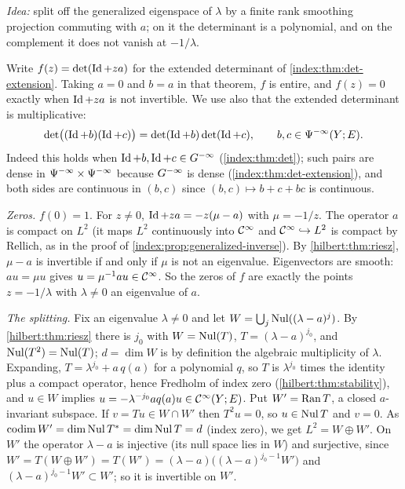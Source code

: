 \subsection*{}
\emph{Idea:} split off the generalized eigenspace of $\lambda$ by a finite rank
smoothing projection commuting with $a$; on it the determinant is a polynomial,
and on the complement it does not vanish at $-1/\lambda$.

Write $f(z)=\det(\operatorname{Id}+za)$ for the extended determinant of
\cref{index:thm:det-extension}. Taking $a=0$ and $b=a$ in that theorem, $f$ is entire,
and $f(z)=0$ exactly when $\operatorname{Id}+za$ is not invertible. We use also that the extended
determinant is multiplicative:
\begin{equation}\label{solindex:eq:mult}
  \det\bigl((\operatorname{Id}+b)(\operatorname{Id}+c)\bigr)=\det(\operatorname{Id}+b)\det(\operatorname{Id}+c),\qquad b,c\in\Psi^{-\infty}(Y;E).
\end{equation}
Indeed this holds when $\operatorname{Id}+b,\operatorname{Id}+c\in G^{-\infty}$ (\cref{index:thm:det}); such pairs are
dense in $\Psi^{-\infty}\times\Psi^{-\infty}$ because $G^{-\infty}$ is dense
(\cref{index:thm:det-extension}), and both sides are continuous in $(b,c)$ since
$(b,c)\mapsto b+c+bc$ is continuous.

\emph{Zeros.} $f(0)=1$. For $z\ne0$, $\operatorname{Id}+za=-z(\mu-a)$ with $\mu=-1/z$. The operator
$a$ is compact on $L^2$ (it maps $L^2$ continuously into $\mathcal{C}^\infty$ and $\mathcal{C}^\infty\hookrightarrow
L^2$ is compact by Rellich, as in the proof of \cref{index:prop:generalized-inverse}).
By \cref{hilbert:thm:riesz}, $\mu-a$ is invertible if and only if $\mu$ is not an
eigenvalue. Eigenvectors are smooth: $au=\mu u$ gives $u=\mu^{-1}au\in\mathcal{C}^\infty$. So the
zeros of $f$ are exactly the points $z=-1/\lambda$ with $\lambda\ne0$ an eigenvalue
of $a$.

\emph{The splitting.} Fix an eigenvalue $\lambda\ne0$ and let
$W=\bigcup_j\operatorname{Nul}((\lambda-a)^j)$. By \cref{hilbert:thm:riesz} there is $j_0$ with
$W=\operatorname{Nul}(T)$, $T=(\lambda-a)^{j_0}$, and $\operatorname{Nul}(T^2)=\operatorname{Nul}(T)$; $d=\dim W$ is by
definition the algebraic multiplicity of $\lambda$. Expanding,
$T=\lambda^{j_0}+a\,q(a)$ for a polynomial $q$, so $T$ is $\lambda^{j_0}$ times the
identity plus a compact operator, hence Fredholm of index zero
(\cref{hilbert:thm:stability}), and $u\in W$ implies
$u=-\lambda^{-j_0}aq(a)u\in\mathcal{C}^\infty(Y;E)$. Put $W'=\operatorname{Ran} T$, a closed $a$-invariant
subspace. If $v=Tu\in W\cap W'$ then $T^2u=0$, so $u\in\operatorname{Nul} T$ and $v=0$. As
$\operatorname{codim}W'=\dim\operatorname{Nul} T^*=\dim\operatorname{Nul} T=d$ (index zero), we get
$L^2=W\oplus W'$. On $W'$ the operator $\lambda-a$ is injective (its null space lies
in $W$) and surjective, since $W'=T(W\oplus W')=T(W')=(\lambda-a)\bigl((\lambda-a)^{j_0-1}W'\bigr)$
and $(\lambda-a)^{j_0-1}W'\subset W'$; so it is invertible on $W'$.

